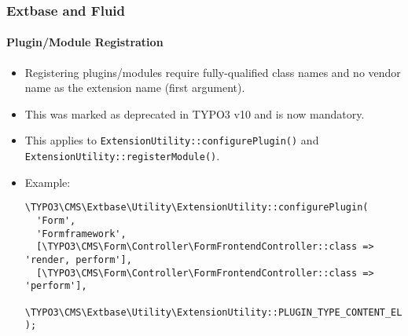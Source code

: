 %

\begin{frame}[fragile]
	\frametitle{Extbase and Fluid}
	\framesubtitle{Plugin/Module Registration}

	\lstset{basicstyle=\tiny\ttfamily}

	\begin{itemize}
		\item Registering plugins/modules require fully-qualified class names
			and no vendor name as the extension name (first argument).
		\item This was marked as deprecated in TYPO3 v10 and is now mandatory.
		\item This applies to
			\small\texttt{ExtensionUtility::configurePlugin()}\normalsize
			and
			\small\texttt{ExtensionUtility::registerModule()}.
		\item Example:
\begin{lstlisting}
\TYPO3\CMS\Extbase\Utility\ExtensionUtility::configurePlugin(
  'Form',
  'Formframework',
  [\TYPO3\CMS\Form\Controller\FormFrontendController::class => 'render, perform'],
  [\TYPO3\CMS\Form\Controller\FormFrontendController::class => 'perform'],
  \TYPO3\CMS\Extbase\Utility\ExtensionUtility::PLUGIN_TYPE_CONTENT_ELEMENT
);
\end{lstlisting}

	\end{itemize}

\end{frame}

